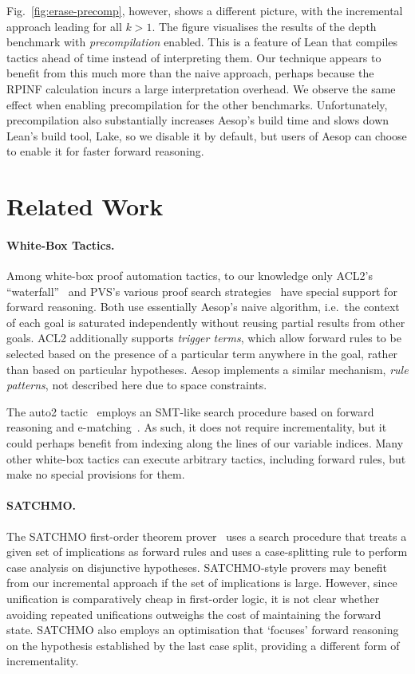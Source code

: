 \documentclass[runningheads,leqno]{llncs}
\begin{document}
Fig.~\ref{fig:erase-precomp}, however, shows a different picture, with the incremental approach leading for all $k > 1$.
The figure visualises the results of the depth benchmark with \emph{precompilation} enabled.
This is a feature of Lean that compiles tactics ahead of time instead of interpreting them.
Our technique appears to benefit from this much more than the naive approach, perhaps because the RPINF calculation incurs a large interpretation overhead.
We observe the same effect when enabling precompilation for the other benchmarks.
Unfortunately, precompilation also substantially increases Aesop's build time and slows down Lean's build tool, Lake, so we disable it by default, but users of Aesop can choose to enable it for faster forward reasoning.

\section{Related Work}

\paragraph{White-Box Tactics.}
Among white-box proof automation tactics, to our knowledge only ACL2's \enquote{waterfall}~\cite{ACL2} and PVS's various proof search strategies~\cite{PVS} have special support for forward reasoning.
Both use essentially Aesop's naive algorithm, i.e.\ the context of each goal is saturated independently without reusing partial results from other goals.
ACL2 additionally supports \emph{trigger terms}, which allow forward rules to be selected based on the presence of a particular term anywhere in the goal, rather than based on particular hypotheses.
Aesop implements a similar mechanism, \emph{rule patterns}, not described here due to space constraints.

The auto2 tactic~\cite{auto2} employs an SMT-like search procedure based on forward reasoning and e-matching~\cite{simplify}.
As such, it does not require incrementality, but it could perhaps benefit from indexing along the lines of our variable indices.
Many other white-box tactics can execute arbitrary tactics, including forward rules, but make no special provisions for them.

\paragraph{SATCHMO.}
The SATCHMO first-order theorem prover~\cite{SATCHMO} uses a search procedure that treats a given set of implications as forward rules and uses a case-splitting rule to perform case analysis on disjunctive hypotheses.
SATCHMO-style provers may benefit from our incremental approach if the set of implications is large.
However, since unification is comparatively cheap in first-order logic, it is not clear whether avoiding repeated unifications outweighs the cost of maintaining the forward state.
SATCHMO also employs an optimisation that \enquote*{focuses} forward reasoning on the hypothesis established by the last case split, providing a different form of incrementality.
\end{document}
